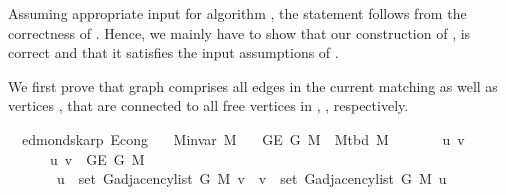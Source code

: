 \begin{isabellebody}
%
\begin{isamarkuptext}%
Assuming appropriate input for algorithm , the statement follows from the
correctness of . Hence, we mainly have to show that our construction of
,  is correct and that it satisfies the input
assumptions of .

We first prove that graph  comprises all edges in the current matching
 as well as vertices ,  that are connected to all free vertices in
, , respectively.%
\end{isamarkuptext}\isamarkuptrue%
\isamarkupfalse%
\ {\isacharparenleft}{\kern0pt}\ edmonds{\isacharunderscore}{\kern0pt}karp{\isacharparenright}{\kern0pt}\ E{}{\isacharunderscore}{\kern0pt}{}{\isacharunderscore}{\kern0pt}cong{\isacharcolon}{\kern0pt}\isanewline
\ \ \ {\isachardoublequoteopen}M{\isachardot}{\kern0pt}invar\ M{\isachardoublequoteclose}\isanewline
\ \ \ {\isachardoublequoteopen}G{\isachardot}{\kern0pt}E\ {\isacharparenleft}{\kern0pt}G{}{\isacharunderscore}{\kern0pt}{}\ M{\isacharparenright}{\kern0pt}\ {\isacharequal}{\kern0pt}\ M{\isacharunderscore}{\kern0pt}tbd\ M{\isachardoublequoteclose}\isanewline
%
\isadelimproof
%
\endisadelimproof
%
\isatagproof
{}\isamarkupfalse%
\ {\isacharminus}{\kern0pt}\isanewline
\ \ \isacommand{{\isacharbraceleft}{\kern0pt}}\isamarkupfalse%
\ \isamarkupfalse%
\ u\ v\isanewline
\ \ \ \ \isamarkupfalse%
\isanewline
\ \ \ \ \ \ {\isachardoublequoteopen}{\isacharbraceleft}{\kern0pt}u{\isacharcomma}{\kern0pt}\ v{\isacharbraceright}{\kern0pt}\ {\isasymin}\ G{\isachardot}{\kern0pt}E\ {\isacharparenleft}{\kern0pt}G{}{\isacharunderscore}{\kern0pt}{}\ M{\isacharparenright}{\kern0pt}\ {\isasymlongleftrightarrow}\isanewline
\ \ \ \ \ \ \ u\ {\isasymin}\ set\ {\isacharparenleft}{\kern0pt}G{\isachardot}{\kern0pt}adjacency{\isacharunderscore}{\kern0pt}list\ {\isacharparenleft}{\kern0pt}G{}{\isacharunderscore}{\kern0pt}{}\ M{\isacharparenright}{\kern0pt}\ v{\isacharparenright}{\kern0pt}\ {\isasymor}\ v\ {\isasymin}\ set\ {\isacharparenleft}{\kern0pt}G{\isachardot}{\kern0pt}adjacency{\isacharunderscore}{\kern0pt}list\ {\isacharparenleft}{\kern0pt}G{}{\isacharunderscore}{\kern0pt}{}\ M{\isacharparenright}{\kern0pt}\ u{\isacharparenright}{\kern0pt}{\isachardoublequoteclose}\isanewline

\end{isabellebody}
